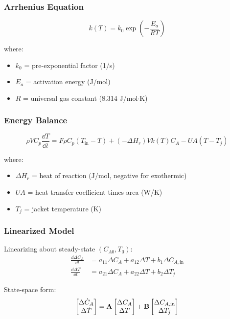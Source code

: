 \subsubsection{Arrhenius Equation}

\begin{equation}
k(T) = k_0 \exp\left(-\frac{E_a}{RT}\right)
\end{equation}

where:
\begin{itemize}
    \item $k_0$ = pre-exponential factor (1/s)
    \item $E_a$ = activation energy (J/mol)
    \item $R$ = universal gas constant (8.314 J/mol$\cdot$K)
\end{itemize}

\subsubsection{Energy Balance}

\begin{equation}
\rho V C_p\frac{\dd T}{\dd t} = F\rho C_p(T_{\text{in}} - T) + (-\Delta H_r)Vk(T)C_A - UA(T - T_j)
\end{equation}

where:
\begin{itemize}
    \item $\Delta H_r$ = heat of reaction (J/mol, negative for exothermic)
    \item $UA$ = heat transfer coefficient times area (W/K)
    \item $T_j$ = jacket temperature (K)
\end{itemize}

\subsubsection{Linearized Model}

Linearizing about steady-state $(C_{A0}, T_0)$:
\begin{align}
\frac{\dd \Delta C_A}{\dd t} &= a_{11}\Delta C_A + a_{12}\Delta T + b_1\Delta C_{A,\text{in}} \\
\frac{\dd \Delta T}{\dd t} &= a_{21}\Delta C_A + a_{22}\Delta T + b_2\Delta T_j
\end{align}

State-space form:
\begin{equation}
\begin{bmatrix} \Delta\dot{C}_A \\ \Delta\dot{T} \end{bmatrix} = \mathbf{A} \begin{bmatrix} \Delta C_A \\ \Delta T \end{bmatrix} + \mathbf{B} \begin{bmatrix} \Delta C_{A,\text{in}} \\ \Delta T_j \end{bmatrix}
\end{equation}

